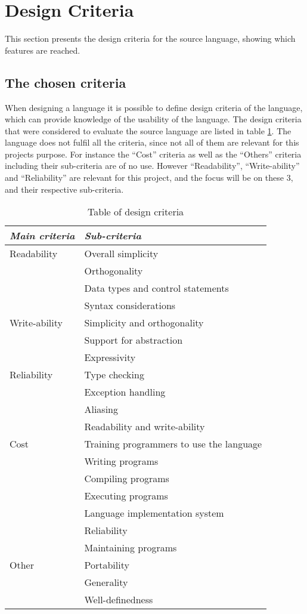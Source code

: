 \chapter{Design Criteria}\label{chap:design-criteria}
This section presents the design criteria for the source language, showing which features are reached. 

\section{The chosen criteria}
When designing a language it is possible to define design criteria of the language, which can provide knowledge of the usability of the language. The design criteria that were considered to evaluate the source language are listed in table \ref{chap:design-criteria}. The language does not fulfil all the criteria, since not all of them are relevant for this projects purpose. For instance the ``Cost'' criteria as well as the ``Others'' criteria including their sub-criteria are of no use. However ``Readability'', ``Write-ability'' and ``Reliability'' are relevant for this project, and the focus will be on these 3, and their respective sub-criteria.

\begin{table}[H]
	\center
	\begin{tabular}{|l|l|}
	\hline
	\emph{Main criteria} & \emph{Sub-criteria} \\ 
 		\hline
 		Readability & Overall simplicity \\
 		 & Orthogonality \\
 		 & Data types and control statements \\
 		 & Syntax considerations \\
 		\hline
 		Write-ability & Simplicity and orthogonality  \\
 		 & Support for abstraction \\
 		 & Expressivity \\
 		\hline
 		Reliability & Type checking \\
 		 & Exception handling \\
 		 & Aliasing \\
 		 & Readability and write-ability \\
 		\hline
 		Cost & Training programmers to use the language \\
 		 & Writing programs \\
 		 & Compiling programs \\
 		 & Executing programs \\
 		 & Language implementation system \\
 		 & Reliability \\
 		 & Maintaining programs \\
 		\hline
 		Other & Portability \\
 		 & Generality \\
 		 & Well-definedness \\
 		\hline
	\end{tabular}
	\label{tab:design}
	\caption{Table of design criteria}
\end{table} 


